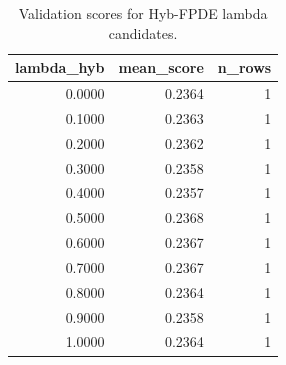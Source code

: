 \begin{table}[t]
\caption{Validation scores for Hyb-FPDE lambda candidates.}
\label{tab:lambda_distribution_computed}
\centering
\begin{tabular}{rrr}
\toprule
lambda\_hyb & mean\_score & n\_rows \\
\midrule
0.0000 & 0.2364 & 1 \\
0.1000 & 0.2363 & 1 \\
0.2000 & 0.2362 & 1 \\
0.3000 & 0.2358 & 1 \\
0.4000 & 0.2357 & 1 \\
0.5000 & 0.2368 & 1 \\
0.6000 & 0.2367 & 1 \\
0.7000 & 0.2367 & 1 \\
0.8000 & 0.2364 & 1 \\
0.9000 & 0.2358 & 1 \\
1.0000 & 0.2364 & 1 \\
\bottomrule
\end{tabular}

\end{table}
